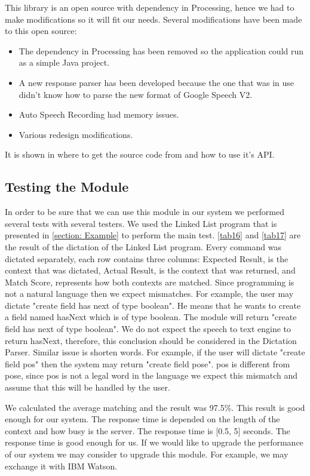 This library is an open source with dependency in Processing, hence we had to make modifications so it will fit our needs. Several modifications have been made to this open source:
\begin{itemize}
	\item The dependency in Processing has been removed so the application could run as a simple Java project. 
	\item A new response parser has been developed because the one that was in use didn't know how to parse the new format of Google Speech V2.
	\item Auto Speech Recording had memory issues.
	\item Various redesign modifications.
\end{itemize}
It is shown in \citet{getflourish14} where to get the source code from and how to use it's API.
\subsection{Testing the Module}
In order to be sure that we can use this module in our system we performed several tests with several testers. We used the Linked List program that is presented in \autoref{section: Example} to perform the main test. \autoref{tab16} and \autoref{tab17} are the result of the dictation of the Linked List program. Every command was dictated separately, each row contains three columns: Expected Result, is the context that was dictated, Actual Result, is the context that was returned, and Match Score, represents how both contexts are matched. Since programming is not a natural language then we expect mismatches. For example, the user may dictate "create field has next of type boolean". He means that he wants to create a field named hasNext which is of type boolean. The module will return "create field has next of type boolean". We do not expect the speech to text engine to return hasNext, therefore, this conclusion should be considered in the Dictation Parser. Similar issue is shorten words. For example, if the user will dictate "create field pos" then the system may return "create field pose". pos is different from pose, since pos is not a legal word in the language we expect this mismatch and assume that this will be handled by the user.

We calculated the average matching and the result was 97.5\%. This result is good enough for our system. The response time is depended on the length of the context and how busy is the server. The response time is [0.5, 5] seconds. The response time is good enough for us. If we would like to upgrade the performance of our system we may consider to upgrade this module. For example, we may exchange it with IBM Watson.


